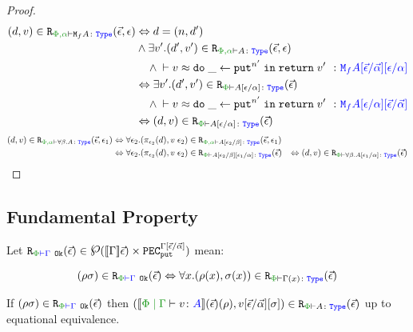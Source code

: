 \documentclass{Report}
\begin{document}
\begin{proof}
    \begin{align*}
        \inLogRel{d}{v}{\P,\a}{\M{f}{A}}{\ev, \e} & \Leftrightarrow d= (n, d')
        \\ & \wedge \exists v'. \inLogRel{d'}{v'}{\P,\a}{A}{\ev, \e}
        \\ & \quad\wedge  \zberelation{v}{\doin{\_}{\put^{n'}}{\return{v'}}}{\M{f}{A}\ssub{\av}{\ev}\ssub{\a}{\e}}
        \\ & \Leftrightarrow \exists v'. \inLogRelPE{d'}{v'}{A\ssub{\a}{\e}}
        \\ & \quad\wedge  \zberelation{v}{\doin{\_}{\put^{n'}}{\return{v'}}}{\M{f}{A}\ssub{\a}{\e}\ssub{\av}{\ev}}
        \\ & \Leftrightarrow \inLogRelPE{d}{v}{A\ssub{\a}{\e}}
    \end{align*}
\case{\tquant}
\begin{align*}
    \inLogRel{d}{v}{\P,\a}{\all{\b}{A}}{\ev, \e_1} & \Leftrightarrow \forall \e_2. \inLogRel{\pi_{\e_2}(d)}{\eapp{v}{\e_2}}{\P,\a}{A\ssub{\b}{\e_2}}{\ev, \e_1}
    \\
    & \Leftrightarrow \forall \e_2. \inLogRelPE{\pi_{\e_2}(d)}{\eapp{v}{\e_2}}{A\ssub{\b}{\e_2}\ssub{\a}{\e_1}}
    & \Leftrightarrow \inLogRelPE{d}{v}{\all{\b}{A\ssub{\a}{\e_1}}}
\end{align*}

\end{proof}



\subsection{Fundamental Property}\label{FundProp}
Let $\erelatesg{\P}{\G}(\ev) \in \powset{\deno{\G}\ev)\times \pecput^{\G\ssub{\av}{\ev}}}$ mean:

\begin{equation}
    \label{LogicalRelationTypeEnvironment}
    \inLogRelPEG{\rho}{\si}{\G} \Leftrightarrow \forall x. \inLogRelPE{\rho(x)}{\si(x)}{\G(x)}
\end{equation}


\begin{theorem}
    If $\inLogRelPEG{\rho}{\si}{\G}$ then $\inLogRelPE{\deno{\gpetyperelation{v}{A}}\fundRho}{v\fundSub}{A}$ up to equational equivalence.    
\end{theorem}
\end{document}
